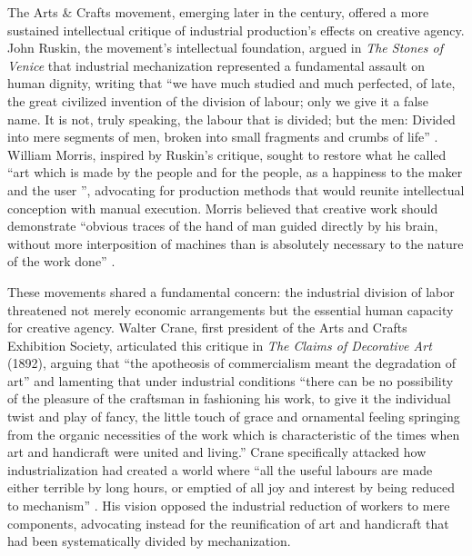 \vspace{0.5cm}

The Arts \& Crafts movement, emerging later in the century, offered a more sustained intellectual critique of industrial production's effects on creative agency. John Ruskin, the movement's intellectual foundation, argued in \textit{The Stones of Venice} that industrial mechanization represented a fundamental assault on human dignity, writing that ``we have much studied and much perfected, of late, the great civilized invention of the division of labour; only we give it a false name. It is not, truly speaking, the labour that is divided; but the men: Divided into mere segments of men, broken into small fragments and crumbs of life'' \citep{ruskin1892}. William Morris, inspired by Ruskin's critique, sought to restore what he called ``art which is made by the people and for the people, as a happiness to the maker and the user \citep{morris1996}'', advocating for production methods that would reunite intellectual conception with manual execution. Morris believed that creative work should demonstrate ``obvious traces of the hand of man guided directly by his brain, without more interposition of machines than is absolutely necessary to the nature of the work done'' \citep{morris1882}.

\vspace{0.5cm}

These movements shared a fundamental concern: the industrial division of labor threatened not merely economic arrangements but the essential human capacity for creative agency. Walter Crane, first president of the Arts and Crafts Exhibition Society, articulated this critique in \textit{The Claims of Decorative Art} (1892), arguing that ``the apotheosis of commercialism meant the degradation of art'' and lamenting that under industrial conditions ``there can be no possibility of the pleasure of the craftsman in fashioning his work, to give it the individual twist and play of fancy, the little touch of grace and ornamental feeling springing from the organic necessities of the work which is characteristic of the times when art and handicraft were united and living.'' Crane specifically attacked how industrialization had created a world where ``all the useful labours are made either terrible by long hours, or emptied of all joy and interest by being reduced to mechanism'' \citep{crane1892}. His vision opposed the industrial reduction of workers to mere components, advocating instead for the reunification of art and handicraft that had been systematically divided by mechanization.

